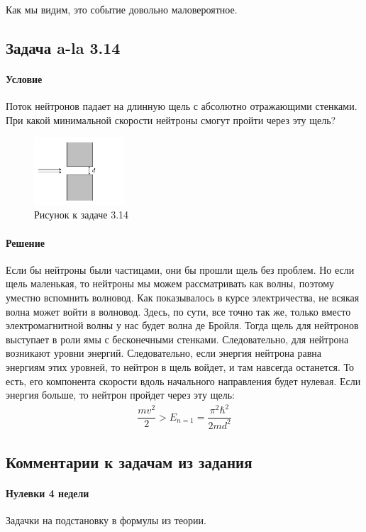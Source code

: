 \documentclass[12pt]{article}
\begin{document}
Как мы видим, это событие довольно маловероятное.

\subsection{Задача a-la 3.14}
\label{task_3.14}
\paragraph{Условие}
Поток нейтронов падает на длинную щель с абсолютно отражающими стенками. При какой минимальной скорости нейтроны смогут пройти через эту щель?
\begin{figure}[h]
    \centering
    \includegraphics[width=0.3\textwidth,height=\textheight,keepaspectratio]{Seminar_04/pics/pic_07.pdf}
    \caption{Рисунок к задаче 3.14}
\end{figure}
\paragraph{Решение}
Если бы нейтроны были частицами, они бы прошли щель без проблем. Но если щель маленькая, то нейтроны мы можем рассматривать как волны, поэтому уместно вспомнить волновод. Как показывалось в курсе электричества, не всякая волна может войти в волновод. Здесь, по сути, все точно так же, только вместо электромагнитной волны у нас будет волна де Бройля. Тогда щель для нейтронов выступает в роли ямы с бесконечными стенками. Следовательно, для нейтрона возникают уровни энергий. Следовательно, если энергия нейтрона равна энергиям этих уровней, то нейтрон в щель войдет, и там навсегда останется. То есть, его компонента скорости вдоль начального направления будет нулевая. Если энергия больше, то нейтрон пройдет через эту щель:
\begin{gather*}
    \dfrac{mv^2}{2} > E_{n=1} = \dfrac{\pi^2\hbar^2}{2md^2}
\end{gather*}

\subsection{Комментарии к задачам из задания}
\paragraph{Нулевки 4 недели} Задачки на подстановку в формулы из теории.
\end{document}
